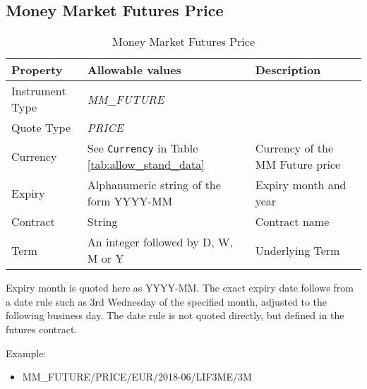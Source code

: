 \subsection{Money Market Futures Price}

\begin{table}[H]
\centering
  \begin{tabular}{|p{3cm}|p{4.5cm}|p{7cm}|}
  \hline
    {\bf Property} & {\bf Allowable values} & {\bf Description} \\ \hline
    Instrument Type & \emph{MM\_FUTURE} & \\ \hline
    Quote Type & \emph{PRICE} & \\ \hline
    Currency & See \lstinline!Currency! in Table \ref{tab:allow_stand_data}& Currency of the MM Future price\\ \hline
    Expiry & Alphanumeric string of the form YYYY-MM & Expiry month and year\\ \hline
    Contract & String & Contract name\\ \hline
    Term & An integer followed by D, W, M or Y & Underlying Term\\ \hline
  \end{tabular}
  \caption{Money Market Futures Price}
  \label{tab:mmfp_quote}
\end{table}

Expiry month is quoted here as YYYY-MM. The exact expiry date follows from a date rule such as 3rd
Wednesday of the specified month, adjusted to the following business day. The date rule is not quoted directly, but
defined in the futures contract.

\medskip
Example:
\begin{itemize}
\item {MM\_FUTURE/PRICE/EUR/2018-06/LIF3ME/3M}
\end{itemize}


